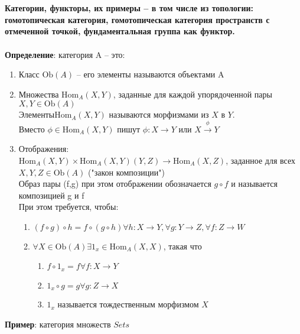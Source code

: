 \newpage
\section{}
	\textbf{Категории, функторы, их примеры -- в том числе из топологии: гомотопическая категория, гомотопическая категория пространств с отмеченной точкой, фундаментальная группа как функтор.}\\
	\\
	\textbf{Определение}: категория A -- это:\\
	\begin{enumerate}
	\item Класс $\text{Ob}(A)$ -- его элементы называются объектами A
	\item Множества $\text{Hom}_A (X,Y)$, заданные для каждой упорядоченной пары $X,Y \in \text{Ob}(A)$\\
		Элементы$ \text{Hom}_A (X,Y)$ называются морфизмами из $X$ в $Y$.\\
		Вместо $\phi \in \text{Hom}_A (X,Y)$ пишут $\phi: X\rightarrow Y$ или $X \overset{\phi}{\rightarrow} Y$
	\item Отображения:\\
		$\text{Hom}_A (X,Y) \times \text{Hom}_A (X,Y) (Y,Z) \rightarrow \text{Hom}_A (X,Z)$, заданное для всех $X,Y,Z \in \text{Ob}(A)$ ("закон композиции")\\
		Образ пары (f,g) при этом отображении обозначается $g \circ f$ и называется композицией g и f\\
		При этом требуется, чтобы:
		\begin{enumerate}
		\item $(f \circ g) \circ h = f \circ (g \circ h) \forall h: X\rightarrow Y, \forall g: Y\rightarrow Z, \forall f: Z\rightarrow W$
		\item $\forall X\in \text{Ob}(A) \exists 1_x \in \text{Hom}_A (X, X)$, такая что
			\begin{enumerate}
			\item $f \circ 1_x = f \forall f: X\rightarrow Y$
			\item $1_x \circ g = g \forall g: Z\rightarrow X$
			\item $1_x$ называется тождественным морфизмом $X$
			\end{enumerate}
		\end{enumerate}
	\end{enumerate}
	\textbf{Пример}: категория множеств $Sets$\\
